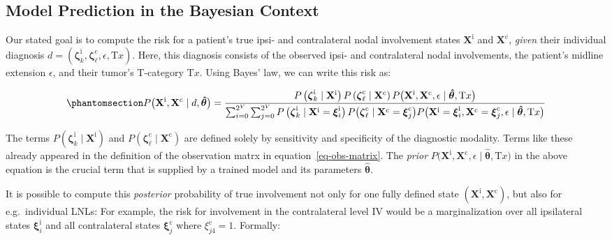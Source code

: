 \documentclass[
  sn-mathphys-num,
]{sn-jnl}
\begin{document}
\subsection{Model Prediction in the Bayesian
Context}\label{model-prediction-in-the-bayesian-context}

Our stated goal is to compute the risk for a patient's true ipsi- and
contralateral nodal involvement states \(\mathbf{X}^\text{i}\) and
\(\mathbf{X}^\text{c}\), \emph{given} their individual diagnosis
\(d = \left( \boldsymbol{\zeta}^\text{i}_k, \boldsymbol{\zeta}^\text{c}_\ell, \epsilon, \text{T}x \right)\).
Here, this diagnosis consists of the observed ipsi- and contralateral
nodal involvements, the patient's midline extension \(\epsilon\), and
their tumor's T-category \(\text{T}x\). Using Bayes' law, we can write
this risk as:

\begin{equation}\phantomsection\label{eq-uni-bayes-law}{
P \big( \mathbf{X}^\text{i}, \mathbf{X}^\text{c} \mid d, \boldsymbol{\hat{\theta}} \big)
= \frac{P \left( \boldsymbol{\zeta}^\text{i}_k \mid \mathbf{X}^\text{i} \right) P \left( \boldsymbol{\zeta}^\text{c}_\ell \mid \mathbf{X}^\text{c} \right) P \big( \mathbf{X}^\text{i}, \mathbf{X}^\text{c}, \epsilon \mid \boldsymbol{\hat{\theta}}, \text{T}x \big)}
{\sum_{i=0}^{2^V} \sum_{j=0}^{2^V} P \left( \boldsymbol{\zeta}^\text{i}_k \mid \mathbf{X}^\text{i}=\boldsymbol{\xi}^\text{i}_i \right) P \big( \boldsymbol{\zeta}^\text{c}_\ell \mid \mathbf{X}^\text{c}=\boldsymbol{\xi}^\text{c}_j \big) P \big( \mathbf{X}^\text{i}=\boldsymbol{\xi}^\text{i}_i, \mathbf{X}^\text{c}=\boldsymbol{\xi}^\text{c}_j, \epsilon \mid \boldsymbol{\hat{\theta}}, \text{T}x \big)}
}\end{equation}

The terms
\(P \left( \boldsymbol{\zeta}^\text{i}_k \mid \mathbf{X}^\text{i} \right)\)
and
\(P \left( \boldsymbol{\zeta}^\text{c}_\ell \mid \mathbf{X}^\text{c} \right)\)
are defined solely by sensitivity and specificity of the diagnostic
modality. Terms like these already appeared in the definition of the
observation matrx in equation~\ref{eq-obs-matrix}. The \emph{prior}
\(P \big( \mathbf{X}^\text{i}, \mathbf{X}^\text{c}, \epsilon \mid \boldsymbol{\hat{\theta}}, \text{T}x \big)\)
in the above equation is the crucial term that is supplied by a trained
model and its parameters \(\boldsymbol{\hat{\theta}}\).

It is possible to compute this \emph{posterior} probability of true
involvement not only for one fully defined state
\((\mathbf{X}^\text{i}, \mathbf{X}^\text{c})\), but also for
e.g.~individual LNLs: For example, the risk for involvement in the
contralateral level IV would be a marginalization over all ipsilateral
states \(\boldsymbol{\xi}^\text{i}_i\) and all contralateral states
\(\boldsymbol{\xi}^\text{c}_j\) where \(\xi^\text{c}_{j4}=1\). Formally:
\end{document}
